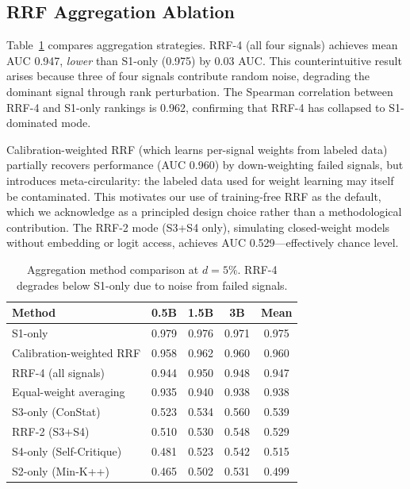 \documentclass[11pt,a4paper]{article}
\begin{document}
\subsection{RRF Aggregation Ablation}
\label{sec:rrf_results}

Table~\ref{tab:rrf_ablation} compares aggregation strategies. RRF-4 (all four signals) achieves mean AUC 0.947, \emph{lower} than S1-only (0.975) by 0.03 AUC. This counterintuitive result arises because three of four signals contribute random noise, degrading the dominant signal through rank perturbation. The Spearman correlation between RRF-4 and S1-only rankings is 0.962, confirming that RRF-4 has collapsed to S1-dominated mode.

Calibration-weighted RRF (which learns per-signal weights from labeled data) partially recovers performance (AUC 0.960) by down-weighting failed signals, but introduces meta-circularity: the labeled data used for weight learning may itself be contaminated. This motivates our use of training-free RRF as the default, which we acknowledge as a principled design choice rather than a methodological contribution. The RRF-2 mode (S3+S4 only), simulating closed-weight models without embedding or logit access, achieves AUC 0.529---effectively chance level.

\begin{table}[t]
\centering
\caption{Aggregation method comparison at $d=5\%$. RRF-4 degrades below S1-only due to noise from failed signals.}
\label{tab:rrf_ablation}
\small
\begin{tabular}{lcccc}
\toprule
\textbf{Method} & \textbf{0.5B} & \textbf{1.5B} & \textbf{3B} & \textbf{Mean} \\
\midrule
S1-only                     & 0.979 & 0.976 & 0.971 & 0.975 \\
Calibration-weighted RRF    & 0.958 & 0.962 & 0.960 & 0.960 \\
RRF-4 (all signals)         & 0.944 & 0.950 & 0.948 & 0.947 \\
Equal-weight averaging      & 0.935 & 0.940 & 0.938 & 0.938 \\
S3-only (ConStat)           & 0.523 & 0.534 & 0.560 & 0.539 \\
RRF-2 (S3+S4)               & 0.510 & 0.530 & 0.548 & 0.529 \\
S4-only (Self-Critique)     & 0.481 & 0.523 & 0.542 & 0.515 \\
S2-only (Min-K++)           & 0.465 & 0.502 & 0.531 & 0.499 \\
\bottomrule
\end{tabular}
\end{table}
\end{document}

